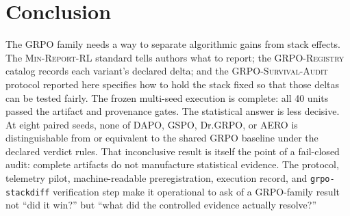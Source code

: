\documentclass[11pt]{article}
\newcommand{\minreport}{\textsc{Min-Report-RL}}
\newcommand{\grpo}{\textsc{GRPO}}
\newcommand{\audit}{\textsc{GRPO-Survival-Audit}}
\newcommand{\grpoReg}{\textsc{GRPO-Registry}}
\begin{document}
\section{Conclusion}

The \grpo{} family needs a way to separate algorithmic gains from stack
effects. The \minreport{} standard tells authors what to report; the
\grpoReg{} catalog records each variant's declared delta; and the \audit{}
protocol reported here specifies how to hold the stack fixed so that those
deltas can be tested fairly. The frozen multi-seed execution is complete: all
40 units passed the artifact and provenance gates. The statistical answer is
less decisive. At eight paired seeds, none of DAPO, GSPO, Dr.\grpo{}, or AERO
is distinguishable from or equivalent to the shared GRPO baseline under the
declared verdict rules. That inconclusive result is itself the point of a
fail-closed audit: complete artifacts do not manufacture statistical evidence.
The protocol, telemetry pilot, machine-readable preregistration, execution
record, and \texttt{grpo-stackdiff} verification step make it operational to
ask of a GRPO-family result not ``did it win?'' but ``what did the controlled
evidence actually resolve?''



\end{document}
